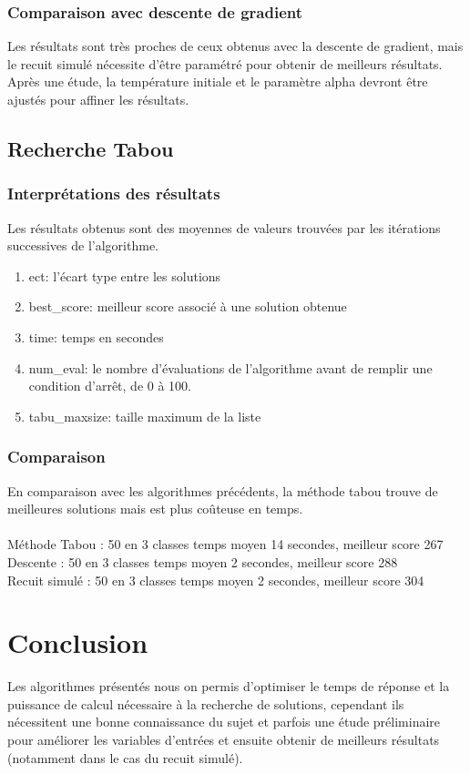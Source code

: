 \documentclass[a4paper]{article}
\begin{document}
		\subsubsection{Comparaison avec descente de gradient}
			Les résultats sont très proches de ceux obtenus avec la descente de gradient, mais le recuit simulé nécessite d’être paramétré pour obtenir de meilleurs résultats.\\
			Après une étude, la température initiale et le paramètre alpha devront être ajustés pour affiner les résultats.

	\subsection{Recherche Tabou}
		\subsubsection{Interprétations des résultats}
			Les résultats obtenus sont des moyennes de valeurs trouvées par les itérations successives de l'algorithme.\\
			\begin{enumerate}
				\item{ect}: l'écart type entre les solutions
				\item{best\_score}: meilleur score associé à une solution obtenue
				\item{time}: temps en secondes
				\item{num\_eval}: le nombre d'évaluations de l'algorithme avant de remplir une condition d'arrêt, de 0 à 100.
				\item{tabu\_maxsize}: taille maximum de la liste
			\end{enumerate}

		\subsubsection{Comparaison}
		 En comparaison avec les algorithmes précédents, la méthode tabou trouve de meilleures solutions mais est plus coûteuse en temps.\\\\
		 Méthode Tabou : 50 en 3 classes temps moyen 14 secondes, meilleur score 267\\
		 Descente : 50 en 3 classes temps moyen 2 secondes, meilleur score 288\\
		 Recuit simulé : 50 en 3 classes temps moyen 2 secondes, meilleur score 304\\


\section{Conclusion}
	Les algorithmes présentés nous on permis d'optimiser le temps de réponse et la puissance de calcul nécessaire à la recherche de solutions, cependant ils nécessitent une bonne connaissance du sujet et parfois une étude préliminaire pour améliorer les variables d'entrées et ensuite obtenir de meilleurs résultats (notamment dans le cas du recuit simulé).
\end{document}
